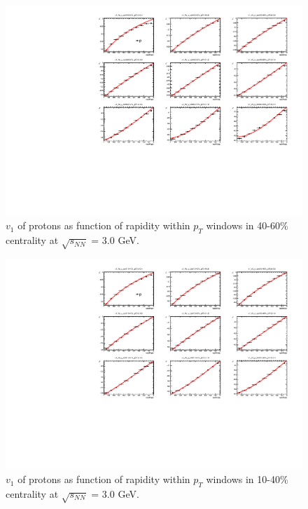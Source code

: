 \begin{figure}[hbt!]
\centering
\includegraphics[width=0.85\linewidth]{figures/chapter03/3gev_protonp_v1VSy_9pT_cent0.pdf}
\caption{$v_1$ of protons as function of rapidity within $p_T$ windows in 40-60\% centrality at $\sqrt{s_{NN}}$ = 3.0 GeV.}
\label{fig:3gev_proton_v1y_pt_cent0}
\end{figure}
            
\begin{figure}[hbt!]
\centering
\includegraphics[width=0.85\linewidth]{figures/chapter03/3gev_protonp_v1VSy_9pT_cent1.pdf}
\caption{$v_1$ of protons as function of rapidity within $p_T$ windows in 10-40\% centrality at $\sqrt{s_{NN}}$ = 3.0 GeV.}
\label{fig:3gev_proton_v1y_pt_cent1}
\end{figure}
                
